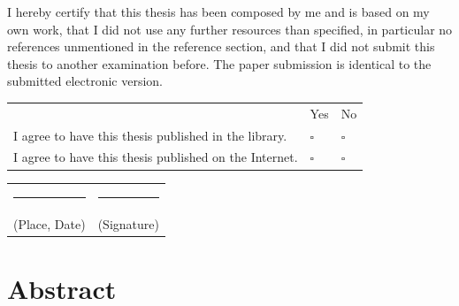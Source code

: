\documentclass[%
    BCOR=10mm,
    DIV=13,
    toc=bibliography,
    toc=listof,
    oneside,
    12pt,
]{scrbook}
\begin{document}
I hereby certify that this thesis has been composed by me and is based on my own
work, that I did not use any further resources than specified, in particular no
references unmentioned in the reference section, and that I did not submit this
thesis to another examination before. The paper submission is identical to the
submitted electronic version.

\vspace{1.5cm}

\noindent
\begin{tabular}{@{}lll@{}}
 & Yes & No \\[0.6em]
I agree to have this thesis published in the library.    & $\square$ & $\square$ \\[0.4em]
I agree to have this thesis published on the Internet.   & $\square$ & $\square$ \\
\end{tabular}

\vspace{2.5cm}

\noindent
\begin{tabular}{@{}p{7cm}p{7cm}@{}}
\rule{6.5cm}{0.4pt} & \rule{6.5cm}{0.4pt} \\
(Place, Date) & (Signature) \\
\end{tabular}

\newpage

\begingroup
\renewcommand*{\raggedchapter}{\centering}
\chapter*{Abstract}
\endgroup
{}
\end{document}
